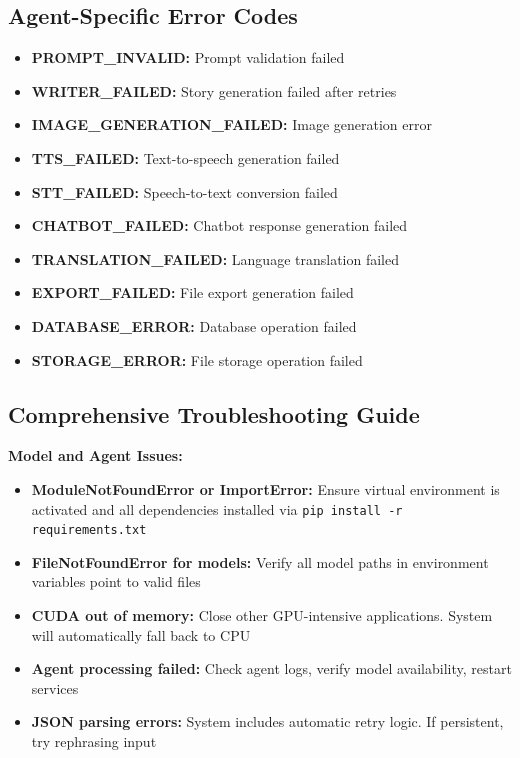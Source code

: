 {\subsection{Agent-Specific Error Codes}
\begin{itemize}
    \item \textbf{PROMPT\_INVALID:} Prompt validation failed
    \item \textbf{WRITER\_FAILED:} Story generation failed after retries
    \item \textbf{IMAGE\_GENERATION\_FAILED:} Image generation error
    \item \textbf{TTS\_FAILED:} Text-to-speech generation failed
    \item \textbf{STT\_FAILED:} Speech-to-text conversion failed
    \item \textbf{CHATBOT\_FAILED:} Chatbot response generation failed
    \item \textbf{TRANSLATION\_FAILED:} Language translation failed
    \item \textbf{EXPORT\_FAILED:} File export generation failed
    \item \textbf{DATABASE\_ERROR:} Database operation failed
    \item \textbf{STORAGE\_ERROR:} File storage operation failed
\end{itemize}

\subsection{Comprehensive Troubleshooting Guide}

\textbf{Model and Agent Issues:}
\begin{itemize}
    \item \textbf{ModuleNotFoundError or ImportError:} Ensure virtual environment is activated and all dependencies installed via \texttt{pip install -r requirements.txt}
    \item \textbf{FileNotFoundError for models:} Verify all model paths in environment variables point to valid files
    \item \textbf{CUDA out of memory:} Close other GPU-intensive applications. System will automatically fall back to CPU
    \item \textbf{Agent processing failed:} Check agent logs, verify model availability, restart services
    \item \textbf{JSON parsing errors:} System includes automatic retry logic. If persistent, try rephrasing input
\end{itemize}

}
